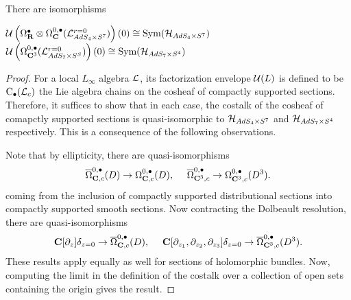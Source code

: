 \documentclass[../main.tex]{subfiles}
\begin{document}
\begin{prop}\label{prop:altstates}
There are isomorphisms
\begin{center}
$\mathcal{U} \left ( \Omega^\bullet_{\mathbf{R}}\otimes \Omega^{0,\bullet}_{\mathbf{C}} (\mathcal{L}_{AdS_4\times S^7}^{r=0} ) \right )(0)\cong \text{Sym}( \mathcal{H}_{AdS_4\times S^7} )$ \\
$\mathcal{U} \left ( \Omega^{0,\bullet}_{\mathbf{C}^3}(\mathcal{L}_{AdS_7\times S^S}^{r=0})\right )(0)\cong \text{Sym}( \mathcal{H}_{AdS_7\times S^4} )$
\end{center}
\end{prop}
\begin{proof}
For a local $L_\infty$ algebra $\mathcal{L}$, its factorization envelope $\mathcal{U}(L)$ is defined to be ${\mathrm{C}}_\bullet (\mathcal{L}_c)$ the Lie algebra chains on the cosheaf of compactly supported sections. Therefore, it suffices to show that in each case, the costalk of the cosheaf of comapctly supported sections is quasi-isomorphic to $\mathcal{H}_{AdS_4\times S^7}$ and $\mathcal{H}_{AdS_7\times S^4}$ respectively. This is a consequence of the following observations.

Note that by ellipticity, there are quasi-isomorphisms 
\[\overline \Omega^{0,\bullet}_{\mathbf{C},c} (D) \to \Omega^{0,\bullet}_{\mathbf{C},c} (D), \ \ \ \ \overline \Omega^{0,\bullet}_{\mathbf{C}^3,c} \to \Omega^{0,\bullet}_{\mathbf{C}^3,c} (D^3).\]
coming from the inclusion of compactly supported distributional sections into compactly supported smooth sections. Now contracting the Dolbeault resolution, there are quasi-isomorphisms
\[\mathbf{C}[\partial_z]\delta_{z=0} \to \overline \Omega^{0,\bullet}_{\mathbf{C},c} (D), \ \ \ \ \mathbf{C}[\partial_{z_1}, \partial_{z_2}, \partial_{z_3}]\delta_{z=0} \to \overline \Omega^{0,\bullet}_{\mathbf{C}^3,c} (D^3).\]
These results apply equally as well for sections of holomorphic bundles. Now, computing the limit in the definition of the costalk over a collection of open sets containing the origin gives the result.
\end{proof}
\end{document}
